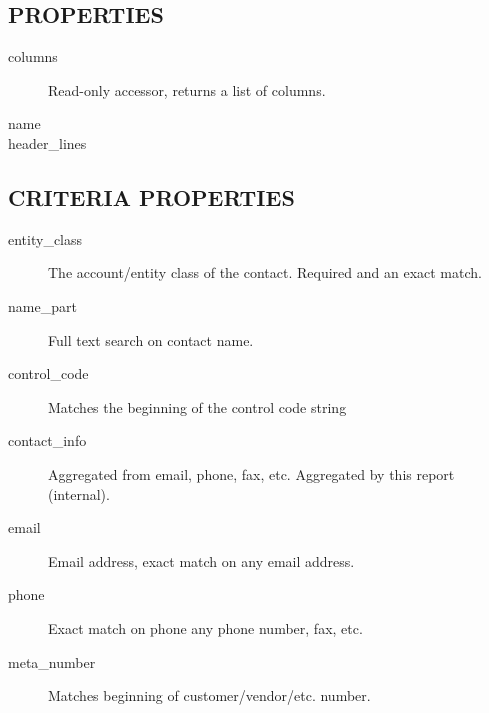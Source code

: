 \begin{description}
\begin{description}
\begin{description}
\begin{description}
\begin{description}
\begin{description}
\begin{description}
\begin{description}
\begin{description}
\begin{description}
\subsection*{PROPERTIES\label{LedgerSMB::DBObject::Report::Contact::Search_PROPERTIES}}
\begin{description}

\item[{columns}] \mbox{}

Read-only accessor, returns a list of columns.


\item[{name}] \mbox{}
\item[{header\_lines}] \mbox{}\end{description}
\subsection*{CRITERIA PROPERTIES\label{LedgerSMB::DBObject::Report::Contact::Search_CRITERIA_PROPERTIES}}
\begin{description}

\item[{entity\_class}] \mbox{}

The account/entity class of the contact.  Required and an exact match.


\item[{name\_part}] \mbox{}

Full text search on contact name.


\item[{control\_code}] \mbox{}

Matches the beginning of the control code string


\item[{contact\_info}] \mbox{}

Aggregated from email, phone, fax, etc.  Aggregated by this report (internal).


\item[{email}] \mbox{}

Email address, exact match on any email address.


\item[{phone}] \mbox{}

Exact match on phone any phone number, fax, etc.


\item[{meta\_number}] \mbox{}

Matches beginning of customer/vendor/etc. number.



\end{description}
\end{description}
\end{description}
\end{description}
\end{description}
\end{description}
\end{description}
\end{description}
\end{description}
\end{description}
\end{description}
